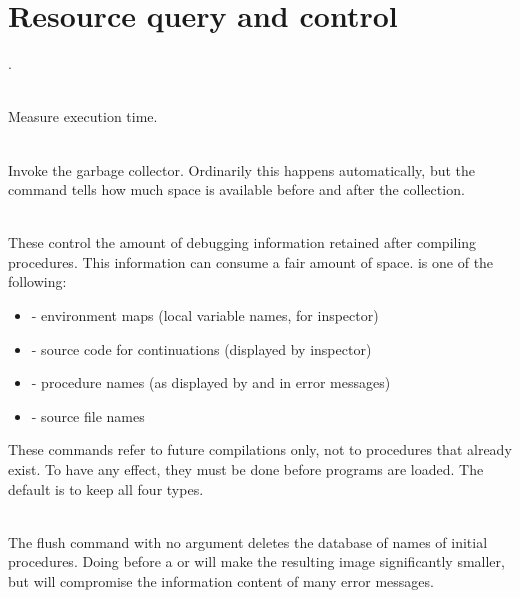 \section{Resource query and control}
\label{resource-commands}.

\begin{description}
\item {}\\
    Measure execution time.

\item {}\\
    Invoke the garbage collector.  Ordinarily this happens
    automatically, but the command tells how much space is available
    before and after the collection.

\item {}
\item {}\\
    These control the amount of debugging information retained after
    compiling procedures.  This information can consume a fair amount
    of space.   is one of the following:
\begin{itemize}
\item {} - environment maps (local variable names, for inspector)
\item {} - source code for continuations (displayed by inspector)
\item {} - procedure names (as displayed by  and in error
       messages)
\item {}  - source file names
\end{itemize}
    These commands refer to future compilations only, not to procedures
    that already exist.  To have any effect, they must be done before
    programs are loaded.  The default is to keep all four types.

\item {}\\
    The flush command with no argument deletes the database of names
    of initial procedures.  Doing  before a  or
    will make the resulting image significantly smaller, but will
    compromise the information content of many error
    messages.
\end{description}

